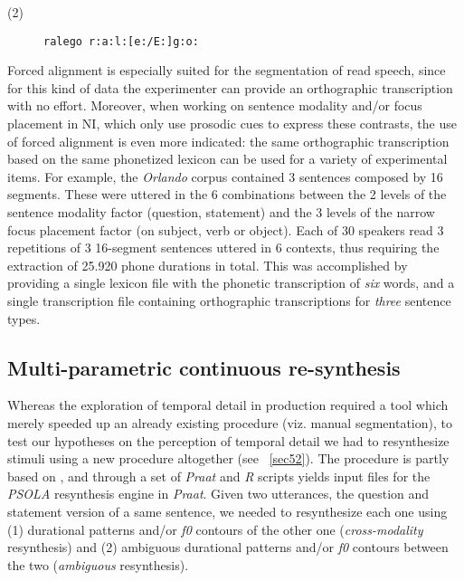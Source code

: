 \begin{description}
   \item[(2)] {\tt ralego r:a:l:[e:/E:]g:o:}
\end{description}\label{ex62}

Forced alignment is especially suited for the segmentation of read speech, since for this kind of data the experimenter can provide an orthographic transcription with no effort. Moreover, when working on sentence modality and/or focus placement in NI, which only use prosodic cues to express these contrasts, the use of forced alignment is even more indicated: the same orthographic transcription based on the same phonetized lexicon can be used for a variety of experimental items. For example, the \textit{Orlando} corpus contained 3 sentences composed by 16 segments. These were uttered in the 6 combinations between the 2 levels of the sentence modality factor (question, statement) and the 3 levels of the narrow focus placement factor (on subject, verb or object). Each of 30 speakers read 3 repetitions of 3 16-segment sentences uttered in 6 contexts, thus requiring the extraction of 25.920 phone durations in total. This was accomplished by providing a single lexicon file with the phonetic transcription of \textit{six} words, and a single transcription file containing orthographic transcriptions for \textit{three} sentence types.

\subsection{Multi-parametric continuous re-synthesis}\label{sec622}
Whereas the exploration of temporal detail in production required a tool which merely speeded up an already existing procedure (viz. manual segmentation), to test our hypotheses on the perception of temporal detail we had to resynthesize stimuli using a new procedure altogether (see ~\ref{sec52}). The procedure is partly based on \citet{gubian2010automatic,gubian2011joint}, and through a set of \textit{Praat} \citep{boersma2008praat} and \textit{R} \citep{r2008r} scripts yields input files for the \textit{PSOLA} \citep{moulines1990pitchsyncronous} resynthesis engine in \textit{Praat}. Given two utterances, the question and statement version of a same sentence, we needed to resynthesize each one using (1) durational patterns and/or \textit{f0} contours of the other one (\textit{cross-modality} resynthesis) and (2) ambiguous durational patterns and/or \textit{f0} contours between the two (\textit{ambiguous} resynthesis).

